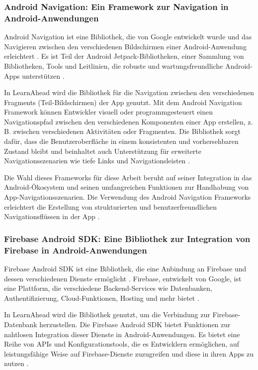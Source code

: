 \subsubsection{Android Navigation: Ein Framework zur Navigation in Android-Anwendungen}
Android Navigation ist eine Bibliothek, die von Google entwickelt wurde und das Navigieren zwischen den verschiedenen Bildschirmen einer Android-Anwendung erleichtert \cite{AndroidNav2022}. Es ist Teil der Android Jetpack-Bibliotheken, einer Sammlung von Bibliotheken, Tools und Leitlinien, die robuste und wartungsfreundliche Android-Apps unterstützen \cite{AndroidJetpack2022}. \newline

\noindent
In LearnAhead wird die Bibliothek für die Navigation zwischen den verschiedenen Fragments (Teil-Bildschirmen) der App genutzt. Mit dem Android Navigation Framework können Entwickler visuell oder programmgesteuert einen Navigationspfad zwischen den verschiedenen Komponenten einer App erstellen, z. B. zwischen verschiedenen Aktivitäten oder Fragmenten. Die Bibliothek sorgt dafür, dass die Benutzeroberfläche in einem konsistenten und vorhersehbaren Zustand bleibt und beinhaltet auch Unterstützung für erweiterte Navigationsszenarien wie tiefe Links und Navigationsleisten \cite{AndroidNav2022}. \newline

\noindent
Die Wahl dieses Frameworks für diese Arbeit beruht auf seiner Integration in das Android-Ökosystem und seinen umfangreichen Funktionen zur Handhabung von App-Navigationsszenarien. Die Verwendung des Android Navigation Frameworks erleichtert die Erstellung von strukturierten und benutzerfreundlichen Navigationsflüssen in der App \cite{AndroidNav2022}.

\subsubsection{Firebase Android SDK: Eine Bibliothek zur Integration von Firebase in Android-Anwendungen}
Firebase Android SDK ist eine Bibliothek, die eine Anbindung an Firebase und dessen verschiedenen Dienste ermöglicht \cite{FirebaseSDK2022}. Firebase, entwickelt von Google, ist eine Plattform, die verschiedene Backend-Services wie Datenbanken, Authentifizierung, Cloud-Funktionen, Hosting und mehr bietet \cite{Firebase2022}. \newline

\noindent
In LearnAhead wird die Bibliothek genutzt, um die Verbindung zur Firebase-Datenbank herzustellen. Die Firebase Android SDK bietet Funktionen zur nahtlosen Integration dieser Dienste in Android-Anwendungen. Es bietet eine Reihe von APIs und Konfigurationstools, die es Entwicklern ermöglichen, auf leistungsfähige Weise auf Firebase-Dienste zuzugreifen und diese in ihren Apps zu nutzen \cite{FirebaseSDK2022}. \newline

